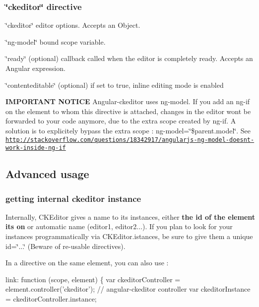 \subsubsection*{\char`\"{}ckeditor\char`\"{} directive}


\begin{DoxyItemize}
\item \char`\"{}ckeditor\char`\"{} editor options. Accepts an Object.
\item \char`\"{}ng-\/model\char`\"{} bound scope variable.
\item \char`\"{}ready\char`\"{} (optional) callback called when the editor is completely ready. Accepts an Angular expression.
\item \char`\"{}contenteditable\char`\"{} (optional) if set to true, inline editing mode is enabled
\end{DoxyItemize}

{\bfseries I\+M\+P\+O\+R\+T\+A\+NT N\+O\+T\+I\+CE} Angular-\/ckeditor uses {\ttfamily ng-\/model}. If you add an {\ttfamily ng-\/if} on the element to whom this directive is attached, changes in the editor won\textquotesingle{}t be forwarded to your code anymore, due to the extra scope created by {\ttfamily ng-\/if}. A solution is to explicitely bypass the extra scope \+: {\ttfamily ng-\/model=\char`\"{}\$parent.\+model\char`\"{}}. See \href{http://stackoverflow.com/questions/18342917/angularjs-ng-model-doesnt-work-inside-ng-if}{\tt http\+://stackoverflow.\+com/questions/18342917/angularjs-\/ng-\/model-\/doesnt-\/work-\/inside-\/ng-\/if}

\subsection*{Advanced usage}

\subsubsection*{getting internal ckeditor instance}

Internally, C\+K\+Editor gives a name to its instances, either {\bfseries the id of the element it\textquotesingle{}s on} or automatic name (editor1, editor2...). If you plan to look for your instances programmatically via {\ttfamily C\+K\+Editor.\+istances}, be sure to give them a unique id=\char`\"{}...\char`\"{} (Beware of re-\/usable directives).

In a directive on the same element, you can also use \+: 
\begin{DoxyCode}
link: function (scope, element) \{
  var ckeditorController = element.controller('ckeditor'); // angular-ckeditor controller
  var ckeditorInstance = ckeditorController.instance;
\end{DoxyCode}


